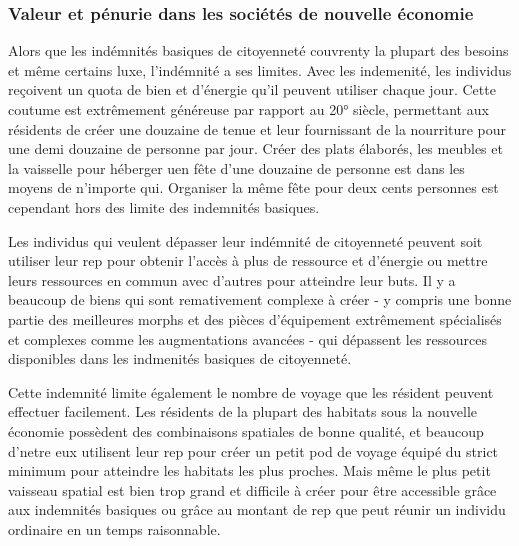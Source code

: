 \subsubsection{Valeur et pénurie dans les sociétés de nouvelle économie} \label{sec:value-scarcity-new} 

Alors que les indémnités basiques de citoyenneté couvrenty la plupart des besoins et même certains luxe, l'indémnité a ses limites. Avec les indemenité, les individus reçoivent un quota de bien et d'énergie qu'il peuvent utiliser chaque jour. Cette coutume est extrêmement généreuse par rapport au 20° siècle, permettant aux résidents de créer une douzaine de tenue et leur fournissant de la nourriture pour une demi douzaine de personne par jour. Créer des plats élaborés, les meubles et la vaisselle pour héberger uen fête d'une douzaine de personne est dans les moyens de n'importe qui. Organiser la même fête pour deux cents personnes est cependant hors des limite des indemnités basiques. 

Les individus qui veulent dépasser leur indémnité de citoyenneté peuvent soit utiliser leur rep pour obtenir l'accès à plus de ressource et d'énergie ou mettre leurs ressources en commun avec d'autres pour atteindre leur buts. Il y a beaucoup de biens qui sont remativement complexe à créer - y compris une bonne partie des meilleures morphs et des pièces d'équipement extrêmement spécialisés et complexes comme les augmentations avancées - qui dépassent les ressources disponibles dans les indmenités basiques de citoyenneté. 

Cette indemnité limite également le nombre de voyage que les résident peuvent effectuer facilement. Les résidents de la plupart des habitats sous la nouvelle économie possèdent des combinaisons spatiales de bonne qualité, et beaucoup d'netre eux utilisent leur rep pour créer un petit pod de voyage équipé du strict minimum pour atteindre les habitats les plus proches. Mais même le plus petit vaisseau spatial est bien trop grand et difficile à créer pour être accessible grâce aux indemnités basiques ou grâce au montant de rep que peut réunir un individu ordinaire en un temps raisonnable. 

